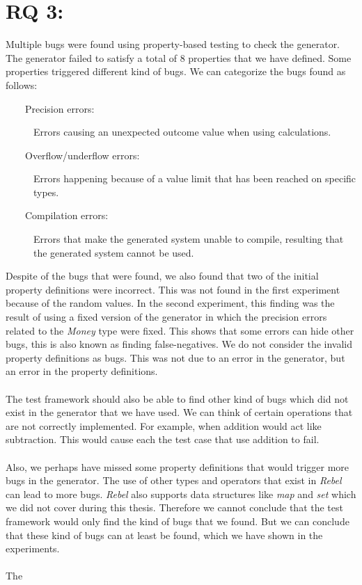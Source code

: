 \section{RQ 3: \rqThree{}}
Multiple bugs were found using property-based testing to check the generator.
The generator failed to satisfy a total of 8 properties that we have defined.
Some properties triggered different kind of bugs. We can categorize the bugs found as follows:
\begin{description}
  \item[~~~~Precision errors:] Errors causing an unexpected outcome value when using calculations.
  \item[~~~~Overflow/underflow errors:] Errors happening because of a value limit that has been reached on specific types.
  \item[~~~~Compilation errors:] Errors that make the generated system unable to compile, resulting that the generated system cannot be used.
\end{description}
Despite of the bugs that were found, we also found that two of the initial property definitions were incorrect. This was not found in the first experiment because of the random values. In the second experiment, this finding was the result of using a fixed version of the generator in which the precision errors related to the \textit{Money} type were fixed. This shows that some errors can hide other bugs, this is also known as finding false-negatives. We do not consider the invalid property definitions as bugs. This was not due to an error in the generator, but an error in the property definitions.\\
\\
The test framework should also be able to find other kind of bugs which did not exist in the generator that we have used. We can think of certain operations that are not correctly implemented. For example, when addition would act like subtraction. This would cause each the test case that use addition to fail.\\
\\
Also, we perhaps have missed some property definitions that would trigger more bugs in the generator. The use of other types and operators that exist in \textit{Rebel} can lead to more bugs. \textit{Rebel} also supports data structures like \textit{map} and \textit{set} which we did not cover during this thesis. Therefore we cannot conclude that the test framework would only find the kind of bugs that we found. But we can conclude that these kind of bugs can at least be found, which we have shown in the experiments.\\
\\
The


